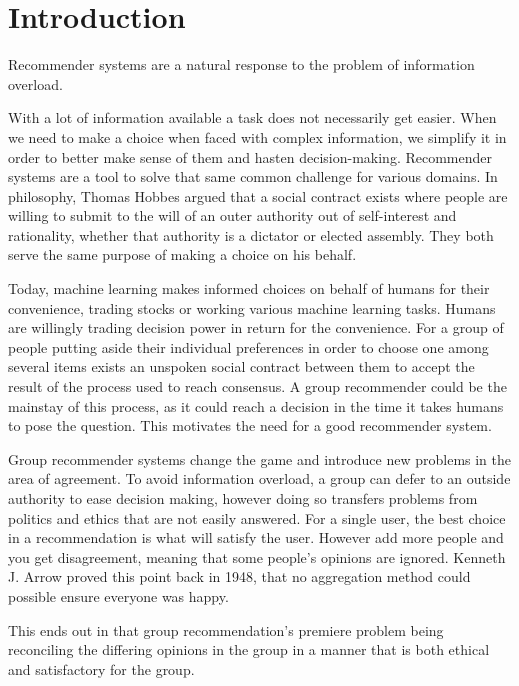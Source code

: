 \chapter{Introduction}
Recommender systems are a natural response to the problem of information overload.

With a lot of information available a task does not necessarily get easier. When we need to make a choice when faced with complex information, we simplify it in order to better make sense of them and hasten decision-making. Recommender systems are a tool to solve that same common challenge for various domains. In philosophy, Thomas Hobbes argued that a social contract exists where people are willing to submit to the will of an outer authority out of self-interest and rationality, whether that authority is a dictator or elected assembly. They both serve the same purpose of making a choice on his behalf.\cite{Hobbes}

Today, machine learning makes informed choices on behalf of humans for their convenience, trading stocks or working various machine learning tasks. Humans are willingly trading decision power in return for the convenience. For a group of people putting aside their individual preferences in order to choose one among several items exists an unspoken social contract between them to accept the result of the process used to reach consensus. A group recommender could be the mainstay of this process, as it could reach a decision in the time it takes humans to pose the question. This motivates the need for a good recommender system.

Group recommender systems change the game and introduce new problems in the area of agreement. To avoid information overload, a group can defer to an outside authority to ease decision making, however doing so transfers problems from politics and ethics that are not easily answered. For a single user, the best choice in a recommendation is what will satisfy the user. However add more people and you get disagreement, meaning that some people's opinions are ignored. Kenneth J. Arrow proved this point back in 1948, that no aggregation method could possible ensure everyone was happy.

This ends out in that group recommendation's premiere problem being reconciling the differing opinions in the group in a manner that is both ethical and satisfactory for the group.


